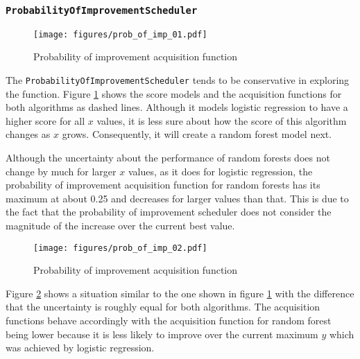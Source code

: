 \documentclass[a4paper,12pt,twoside,openright]{report}
\begin{document}

\subsubsection{\texttt{ProbabilityOfImprovementScheduler}}
\begin{figure}
\centering
  \texttt{[image: figures/prob\_of\_imp\_01.pdf]}
  \caption{Probability of improvement acquisition function}
  \label{sched:probofimpr1}
\end{figure}

The \texttt{ProbabilityOfImprovementScheduler} tends to be conservative in exploring the function. Figure \ref{sched:probofimpr1} shows the score models and the acquisition functions for both algorithms as dashed lines. Although it models logistic regression to have a higher score for all $x$ values, it is less sure about how the score of this algorithm changes as $x$ grows. Consequently, it will create a random forest model next.

Although the uncertainty about the performance of random forests does not change by much for larger $x$ values, as it does for logistic regression, the probability of improvement acquisition function for random forests has its maximum at about 0.25 and decreases for larger values than that. This is due to the fact that the probability of improvement scheduler does not consider the magnitude of the increase over the current best value.

\begin{figure}
\centering
  \texttt{[image: figures/prob\_of\_imp\_02.pdf]}
  \caption{Probability of improvement acquisition function}
  \label{sched:probofimpr2}
\end{figure}

Figure \ref{sched:probofimpr2} shows a situation similar to the one shown in figure \ref{sched:probofimpr1} with the difference that the uncertainty is roughly equal for both algorithms. The acquisition functions behave accordingly with the acquisition function for random forest being lower because it is less likely to improve over the current maximum $y$ which was achieved by logistic regression.
\end{document}
